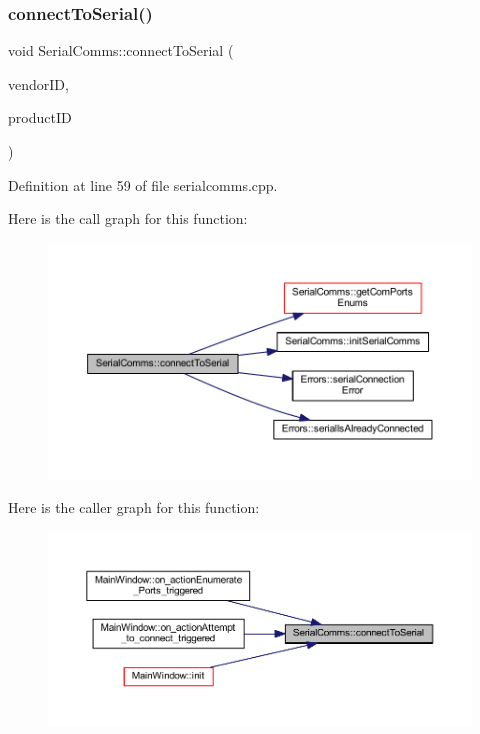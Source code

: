 \subsubsection{\texorpdfstring{connectToSerial()}{connectToSerial()}}
{\footnotesize\ttfamily void Serial\+Comms\+::connect\+To\+Serial (\begin{DoxyParamCaption}\item[{Q\+String}]{vendor\+ID,  }\item[{Q\+String}]{product\+ID }\end{DoxyParamCaption})}



Definition at line 59 of file serialcomms.\+cpp.

Here is the call graph for this function\+:
\nopagebreak
\begin{figure}[H]
\begin{center}
\leavevmode
\includegraphics[width=350pt]{classSerialComms_a4488e53e2a6693ad72759eff9862ac37_cgraph}
\end{center}
\end{figure}
Here is the caller graph for this function\+:
\nopagebreak
\begin{figure}[H]
\begin{center}
\leavevmode
\includegraphics[width=350pt]{classSerialComms_a4488e53e2a6693ad72759eff9862ac37_icgraph}
\end{center}
\end{figure}
\mbox{\label{classSerialComms_a437fbaf140deae42fa64d914f8d13ec8}} 
